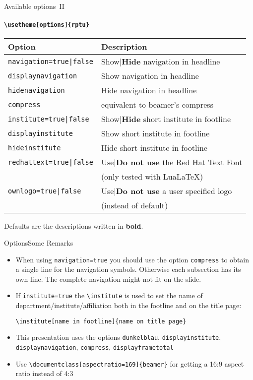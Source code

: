 \documentclass[]{beamer}
\begin{document}
\begin{frame}{Available options~II}
\framesubtitle{\texttt{\textbackslash usetheme[options]\{rptu\}}}
	\begin{tabular}{ll}
		\textbf{Option} & \textbf{Description}\\ \hline
		\texttt{navigation=true|false} &Show|\textbf{Hide} navigation in headline \\
		\texttt{displaynavigation} & Show navigation in headline \\ 
		\texttt{hidenavigation} & Hide navigation in headline \\  \hline
		\texttt{compress} & equivalent to beamer's compress \\ \hline
		\texttt{institute=true|false} &Show|\textbf{Hide} short institute in footline \\
		\texttt{displayinstitute} & Show short institute in footline \\ 
		\texttt{hideinstitute} & Hide short institute in footline \\ \hline
		\texttt{redhattext=true|false} & Use|\textbf{Do not use} the Red Hat Text Font \\ & (only tested with LuaLaTeX) \\ \hline
		\texttt{ownlogo=true|false} & Use|\textbf{Do not use} a user specified logo \\ & (instead of default)
	\end{tabular}
	\vspace*{2ex}
	
	Defaults are the descriptions written in \textbf{bold}.
\end{frame}

\begin{frame}{Options}{Some Remarks}
\begin{itemize}
	\item When using \texttt{navigation=true} you should use the option \texttt{compress} to obtain a single line for the navigation symbols. Otherwise each subsection has its own line. The complete navigation might not fit on the slide.
	\item If \texttt{institute=true} the \texttt{\textbackslash institute} is used to set the name of department/institute/affiliation both in the footline and on the title page:	
	
		\texttt{\textbackslash institute[name in footline]\{name on title page\}}
	 
	\item This presentation uses the options \texttt{dunkelblau},
		  \texttt{displayinstitute}, \texttt{displaynavigation},
		  \texttt{compress},
          \texttt{displayframetotal}
        \item Use \texttt{\textbackslash documentclass[aspectratio=169]\{beamer\}} for getting a 16:9 aspect ratio instead of 4:3
\end{itemize}
	\end{frame}
\end{document}
